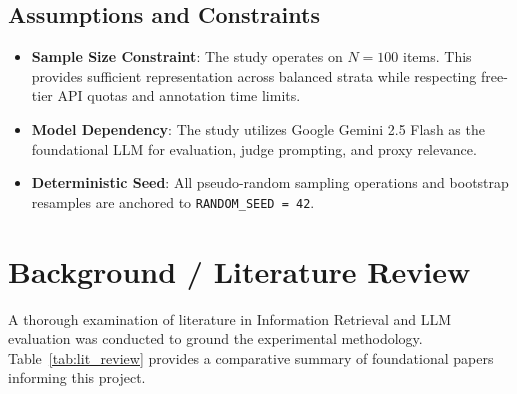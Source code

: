 \documentclass[11pt,a4paper]{article}
\begin{document}
\subsection{Assumptions and Constraints}
\begin{itemize}[leftmargin=*]
    \item \textbf{Sample Size Constraint}: The study operates on $N=100$ items. This provides sufficient representation across balanced strata while respecting free-tier API quotas and annotation time limits.
    \item \textbf{Model Dependency}: The study utilizes Google Gemini 2.5 Flash as the foundational LLM for evaluation, judge prompting, and proxy relevance.
    \item \textbf{Deterministic Seed}: All pseudo-random sampling operations and bootstrap resamples are anchored to \texttt{RANDOM\_SEED = 42}.
\end{itemize}

\section{Background / Literature Review}

A thorough examination of literature in Information Retrieval and LLM evaluation was conducted to ground the experimental methodology. Table~\ref{tab:lit_review} provides a comparative summary of foundational papers informing this project.
\end{document}
